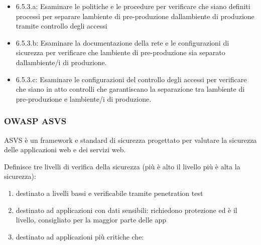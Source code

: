 \documentclass[
]{article}
\providecommand{\tightlist}{%
  \setlength{\itemsep}{0pt}\setlength{\parskip}{0pt}}
\begin{document}
\begin{itemize}
\tightlist
\item
  {6.5.3.a}{: Esaminare le politiche e le procedure per verificare che
  siano definiti processi per separare l\textquotesingle ambiente di
  pre-produzione dall\textquotesingle ambiente di produzione tramite
  controllo degli accessi}
\item
  {6.5.3.b}{: Esaminare la documentazione della rete e le configurazioni
  di sicurezza per verificare che l\textquotesingle ambiente di
  pre-produzione sia separato dall\textquotesingle ambiente/i di
  produzione. }
\item
  {6.5.3.c}{: Esaminare le configurazioni del controllo degli accessi
  per verificare che siano in atto controlli che garantiscano la
  separazione tra l\textquotesingle ambiente di pre-produzione e
  l\textquotesingle ambiente/i di produzione.}
\end{itemize}

\subsubsection{\texorpdfstring{{OWASP
ASVS}}{OWASP ASVS}}\label{h.t8fe0x6y8lh3}

{ASVS è un framework e standard di sicurezza progettato per valutare la
sicurezza delle applicazioni web e dei servizi web.}

{}

{Definisce tre livelli di verifica della sicurezza (più è alto il
livello più è alta la sicurezza):}

\begin{enumerate}
\tightlist
\item
  {destinato a livelli bassi e verificabile tramite penetration test}
\end{enumerate}

{}

\begin{enumerate}
\setcounter{enumi}{1}
\tightlist
\item
  {destinato ad applicazioni con dati sensibili: richiedono protezione
  ed è il livello, consigliato per la maggior parte delle app}
\end{enumerate}

{}

\begin{enumerate}
\setcounter{enumi}{2}
\tightlist
\item
  {destinato ad applicazioni più critiche che: }
\end{enumerate}
\end{document}
